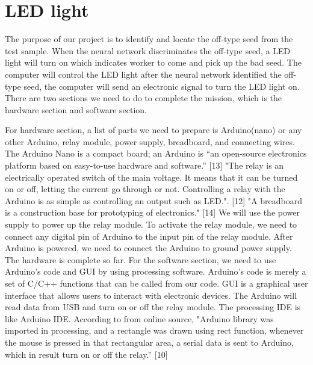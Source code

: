 \documentclass[onecolumn, draftclsnofoot,10pt, compsoc]{IEEEtran}
\begin{document}
\section{LED light}
\par
The purpose of our project is to identify and locate the off-type seed from the test sample. When the neural network discriminates the off-type seed, a LED light will turn on which indicates worker to come and pick up the bad seed. The computer will control the LED light after the neural network identified the off-type seed, the computer will send an electronic signal to turn the LED light on. There are two sections we need to do to complete the mission, which is the hardware section and software section. 
\par
For hardware section, a list of parts we need to prepare is Arduino(nano) or any other Arduino, relay module, power supply, breadboard, and connecting wires. The Arduino Nano is a compact board; an Arduino is “an open-source electronics platform based on easy-to-use hardware and software.” [13]  "The relay is an electrically operated switch of the main voltage. It means that it can be turned on or off, letting the current go through or not. Controlling a relay with the Arduino is as simple as controlling an output such as LED.". [12] "A breadboard is a construction base for prototyping of electronics." [14] We will use the power supply to power up the relay module. To activate the relay module, we need to connect any digital pin of Arduino to the input pin of the relay module. After Arduino is powered, we need to connect the Arduino to ground power supply. The hardware is complete so far. For the software section, we need to use Arduino's code and GUI by using processing software. Arduino's code is merely a set of C/C++ functions that can be called from our code. GUI is a graphical user interface that allows users to interact with electronic devices. The Arduino will read data from USB and turn on or off the relay module. The processing IDE is like Arduino IDE. According to from online source, "Arduino library was imported in processing, and a rectangle was drawn using rect function, whenever the mouse is pressed in that rectangular area, a serial data is sent to Arduino, which in result turn on or off the relay.” [10]
\par
\end{document}
